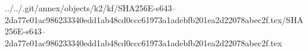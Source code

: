 ../../.git/annex/objects/k2/kf/SHA256E-s643--2da77e01ac986233340edd1ab48cd0ccc61973a1adebfb201ea2d22078abec2f.tex/SHA256E-s643--2da77e01ac986233340edd1ab48cd0ccc61973a1adebfb201ea2d22078abec2f.tex